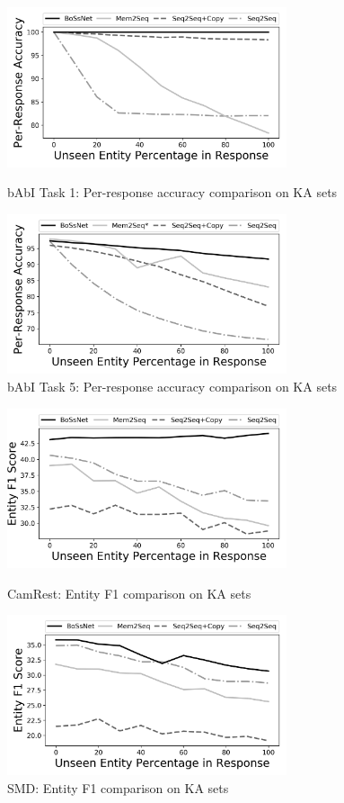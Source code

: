 \begin{figure}
\centering
\begin{minipage}[b]{.475\textwidth}
\includegraphics[width=\textwidth, height=4.7cm]{assets/graphs/task1_Acc.png}
\caption{bAbI Task 1: Per-response accuracy comparison on KA sets}\label{label-a}
\end{minipage}\qquad
\begin{minipage}[b]{.475\textwidth}
 \includegraphics[width=\textwidth, height=4.7cm]{assets/graphs/task5_Acc.png}
        \caption{bAbI Task 5: Per-response accuracy comparison on KA sets}\label{label-b}
\end{minipage}
\end{figure}

\begin{figure}
\centering
\begin{minipage}[b]{.475\textwidth}
\includegraphics[width=\textwidth, height=4.7cm]{assets/graphs/camrest_F1.png}
\caption{CamRest: Entity F1 comparison on KA sets}\label{label-c}
\end{minipage}\qquad
\begin{minipage}[b]{.475\textwidth}
 \includegraphics[width=\textwidth, height=4.7cm]{assets/graphs/smd_F1.png}
\caption{SMD: Entity F1 comparison on KA sets}\label{label-d}
\end{minipage}
\end{figure}

